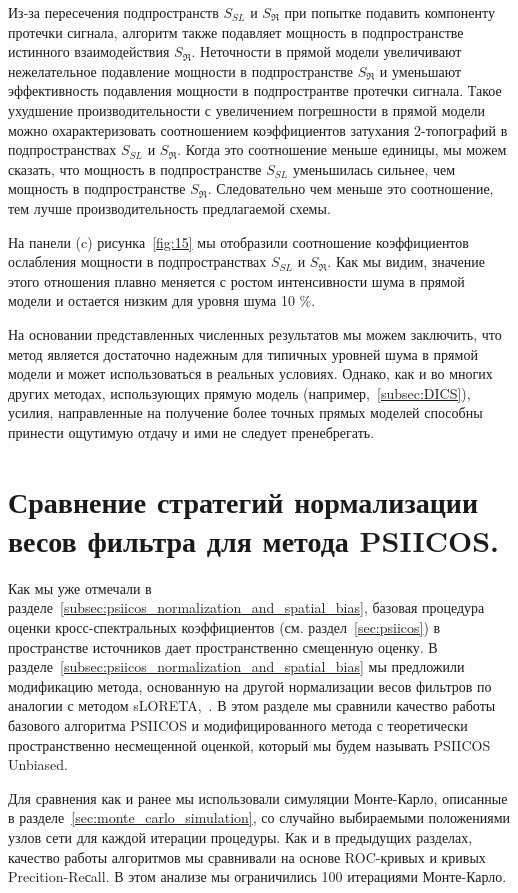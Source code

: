 Из-за пересечения подпространств $S_{SL}$ и $S_{\Re} $ при попытке
подавить компоненту протечки сигнала, алгоритм также подавляет мощность в
подпространстве истинного взаимодействия $S_{\Re}$. Неточности в прямой модели
увеличивают нежелательное подавление мощности в подпространстве $S_{\Re} $ и уменьшают
эффективность подавления мощности в подпространтве протечки сигнала.
Такое ухудшение производительности с увеличением погрешности в прямой модели
можно охарактеризовать соотношением коэффициентов затухания 2-топографий в подпространствах $S_{SL}$ и $S_{\Re}$.
Когда это соотношение меньше единицы, мы можем сказать, что мощность в подпространстве $S_{SL}$
уменьшилась сильнее, чем мощность в подпространстве $ S_{\Re}$. Следовательно
чем меньше это соотношение, тем лучше производительность предлагаемой схемы.

На панели (c) рисунка~\ref{fig:15} мы отобразили соотношение коэффициентов ослабления мощности в подпространствах
$S_{SL}$ и $ S_{\Re}$. Как мы видим, значение этого отношения плавно меняется с
ростом интенсивности шума в прямой модели и остается низким для уровня шума 10 \%.

На основании представленных численных результатов мы можем заключить, что метод
является достаточно надежным для типичных уровней шума в прямой модели и может
использоваться в реальных условиях.  Однако, как и во многих других методах,
использующих прямую модель (например,~\ref{subsec:DICS}), усилия, направленные на
получение более точных прямых моделей способны принести ощутимую отдачу и ими
не следует пренебрегать.



\section{Сравнение стратегий нормализации весов фильтра для метода PSIICOS.}
Как мы уже отмечали в разделе~\ref{subsec:psiicos_normalization_and_spatial_bias},
базовая процедура оценки кросс-спектральных коэффициентов (см.
раздел~\ref{sec:psiicos}) в пространстве источников дает пространственно смещенную оценку.
В разделе~\ref{subsec:psiicos_normalization_and_spatial_bias} мы предложили модификацию
метода, основанную на другой нормализации весов фильтров по аналогии с методом sLORETA,~\cite{Pascual-Marqui2002}.
В этом разделе мы сравнили качество работы базового алгоритма PSIICOS и модифицированного метода
с теоретически пространственно несмещенной оценкой, который мы будем называть PSIICOS Unbiased.

Для сравнения как и ранее мы использовали симуляции Монте-Карло,
описанные в разделе~\ref{sec:monte_carlo_simulation}, со случайно выбираемыми положениями узлов сети
для каждой итерации процедуры. Как и в предыдущих разделах, качество работы алгоритмов мы сравнивали
на основе ROC-кривых и кривых Precition-Reсall. В этом анализе мы ограничились 100 итерациями Монте-Карло.


